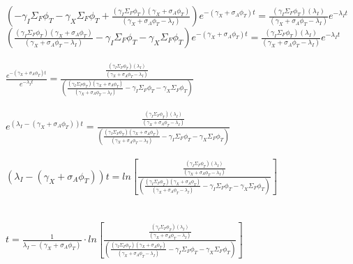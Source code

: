 \documentclass[11pt,a4paper]{article}
\begin{document}
\noindent $(-\gamma_I\Sigma_F\phi_T-\gamma_X\Sigma_F\phi_T+\frac{(\gamma_I\Sigma_F\phi_T)(\gamma_X+\sigma_A\phi_T)}{(\gamma_X+\sigma_A\phi_T-\lambda_I)})e^{-(\gamma_X+\sigma_A\phi_T)t}=\frac{(\gamma_I\Sigma_F\phi_T)(\lambda_I)}{(\gamma_X+\sigma_A\phi_T-\lambda_I)}e^{-\lambda_I t}$ \\

\noindent $(\frac{(\gamma_I\Sigma_F\phi_T)(\gamma_X+\sigma_A\phi_T)}{(\gamma_X+\sigma_A\phi_T-\lambda_I)}-\gamma_I\Sigma_F\phi_T-\gamma_X\Sigma_F\phi_T)e^{-(\gamma_X+\sigma_A\phi_T)t}=\frac{(\gamma_I\Sigma_F\phi_T)(\lambda_I)}{(\gamma_X+\sigma_A\phi_T-\lambda_I)}e^{-\lambda_I t}$ \\ \\

\noindent $\frac{e^{-(\gamma_X+\sigma_A\phi_T)t}}{e^{-\lambda_I t}}=\frac{\frac{(\gamma_I\Sigma_F\phi_T)(\lambda_I)}{(\gamma_X+\sigma_A\phi_T-\lambda_I)}}{(\frac{(\gamma_I\Sigma_F\phi_T)(\gamma_X+\sigma_A\phi_T)}{(\gamma_X+\sigma_A\phi_T-\lambda_I)}-\gamma_I\Sigma_F\phi_T-\gamma_X\Sigma_F\phi_T)}$ \\ \\

\noindent $e^{(\lambda_I-(\gamma_X+\sigma_A\phi_T))t}=\frac{\frac{(\gamma_I\Sigma_F\phi_T)(\lambda_I)}{(\gamma_X+\sigma_A\phi_T-\lambda_I)}}{(\frac{(\gamma_I\Sigma_F\phi_T)(\gamma_X+\sigma_A\phi_T)}{(\gamma_X+\sigma_A\phi_T-\lambda_I)}-\gamma_I\Sigma_F\phi_T-\gamma_X\Sigma_F\phi_T)}$ \\ \\

\noindent $(\lambda_I-(\gamma_X+\sigma_A\phi_T))t=ln[\frac{\frac{(\gamma_I\Sigma_F\phi_T)(\lambda_I)}{(\gamma_X+\sigma_A\phi_T-\lambda_I)}}{(\frac{(\gamma_I\Sigma_F\phi_T)(\gamma_X+\sigma_A\phi_T)}{(\gamma_X+\sigma_A\phi_T-\lambda_I)}-\gamma_I\Sigma_F\phi_T-\gamma_X\Sigma_F\phi_T)}]$ \\ \\ \\

\noindent $t=\frac{1}{\lambda_I-(\gamma_X+\sigma_A\phi_T)}\cdot  ln[\frac{\frac{(\gamma_I\Sigma_F\phi_T)(\lambda_I)}{(\gamma_X+\sigma_A\phi_T-\lambda_I)}}{(\frac{(\gamma_I\Sigma_F\phi_T)(\gamma_X+\sigma_A\phi_T)}{(\gamma_X+\sigma_A\phi_T-\lambda_I)}-\gamma_I\Sigma_F\phi_T-\gamma_X\Sigma_F\phi_T)}]$
\end{document}
